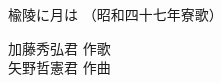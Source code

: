 \documentclass[10pt,b5j]{tarticle} %
\begin{document}
\begin{minipage}[c]{0.7\hsize} %
    \begin{center}
        {\LARGE
            楡陵に月は %
        }
        {\small 
            （昭和四十七年寮歌） %
        }
    \end{center}
\end{minipage}
\begin{minipage}[c]{0.3\hsize} %
    \begin{flushright} %
        加藤秀弘君 作歌\\矢野哲憲君 作曲 %
    \end{flushright}
\end{minipage}
\end{document}
